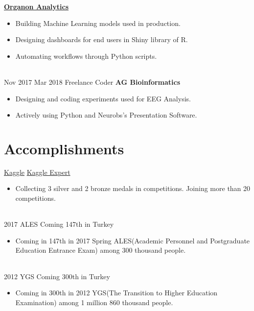\documentclass[letterpaper]{DS_class_file} %
\begin{document}
\begin{twenty}
		{\href{http://www.organonanalytics.com/pages/index.php}{\textbf{Organon Analytics}}}
		{}
		{\begin{itemize}
			\item Building Machine Learning models used in production.
			\item Designing dashboards for end users in Shiny library of R.
			\item Automating workflows through Python scripts.
		\end{itemize}}
		\\
	\twentyitem
    	{Nov 2017}
		{Mar 2018}
        {\hspace{0.3cm}Freelance Coder}
        {\textbf{AG Bioinformatics}}
        {}
        {\begin{itemize}
        \item Designing and coding experiments used for EEG Analysis.
        \item Actively using Python and Neurobs's Presentation Software.
        \end{itemize}}
\end{twenty}

\section{Accomplishments}

\begin{twenty} %
	\twentyitem
	{\href{https://www.kaggle.com}{Kaggle}}
	{}
	{\hspace{0.3cm}\href{https://www.kaggle.com/mbkinaci}{Kaggle Expert}}
	{}
	{}
	{
		{\begin{itemize}
				\item Collecting 3 silver and 2 bronze medals in competitions. Joining more than 20 competitions.
		\end{itemize}}
	}
	\\
	\twentyitem
	{2017 ALES}
	{}
	{\hspace{0.3cm}Coming 147th in Turkey}
	{}
	{}
	{
		{\begin{itemize}
				\item Coming in 147th in 2017 Spring ALES(Academic Personnel and Postgraduate Education Entrance Exam) among 300 thousand people.
		\end{itemize}}
	}
	\\
	\twentyitem
	{2012 YGS}
	{}
	{\hspace{0.3cm}Coming 300th in Turkey}
	{}
	{}
	{\begin{itemize}
			\item Coming in 300th in 2012 YGS(The Transition to Higher Education \newline Examination) among 1 million 860 thousand people.       
	\end{itemize}}

\end{twenty}
\end{document}

